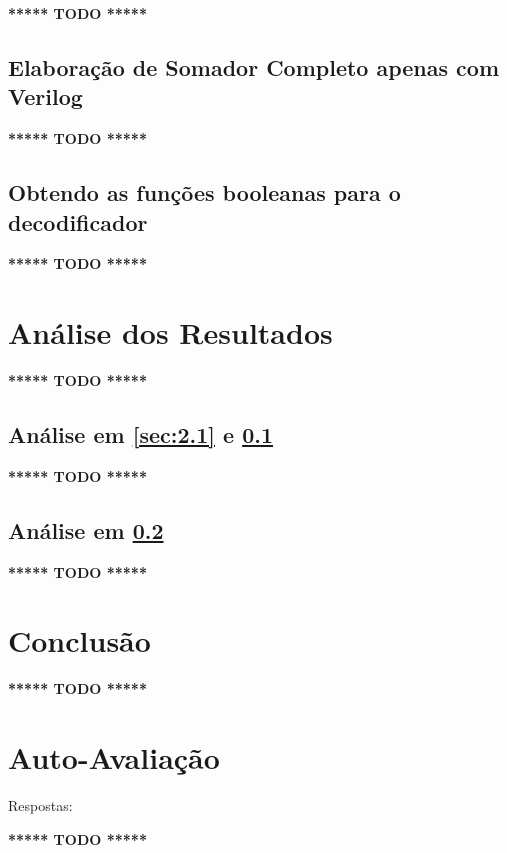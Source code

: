 \documentclass[12pt]{article}
\begin{document}
\textbf{***** TODO *****}

\subsection{Elaboração de Somador Completo apenas com Verilog}\label{sec:2.2}

\textbf{***** TODO *****}

\subsection{Obtendo as funções booleanas para o decodificador}\label{sec:2.3}

\textbf{***** TODO *****}

\section{Análise dos Resultados}
\label{sec:resultados}

\textbf{***** TODO *****}

\subsection{Análise em \ref{sec:2.1} e \ref{sec:2.2}}\label{sec:analise2.1}

\textbf{***** TODO *****}

\subsection{Análise em \ref{sec:2.3}}\label{sec:analise2.4}

\textbf{***** TODO *****}

\section{Conclusão}
\label{sec:Conclusao}

\textbf{***** TODO *****}

\nocite{*}



\newpage
\section*{Auto-Avaliação}

Respostas:

\textbf{***** TODO *****}
\end{document}

